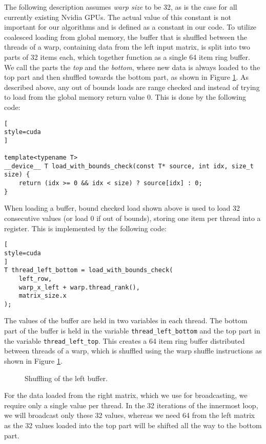 The following description assumes \textit{warp size} to be 32, as is the case for all currently existing Nvidia GPUs. The actual value of this constant is not important for our algorithms and is defined as a constant in our code. To utilize coalesced loading from global memory, the buffer that is shuffled between the threads of a warp, containing data from the left input matrix, is split into two parts of 32 items each, which together function as a single 64 item ring buffer. We call the parts the \textit{top} and the \textit{bottom}, where new data is always loaded to the top part and then shuffled towards the bottom part, as shown in Figure \ref{fig:shuffle_buffer}. As described above, any out of bounds loads are range checked and instead of trying to load from the global memory return value 0. This is done by the following code:
\begin{lstlisting}[
style=cuda
]

template<typename T>
__device__ T load_with_bounds_check(const T* source, int idx, size_t size) {
	return (idx >= 0 && idx < size) ? source[idx] : 0;
}
\end{lstlisting}


When loading a buffer, bound checked load shown above is used to load 32 consecutive values (or load 0 if out of bounds), storing one item per thread into a register. This is implemented by the following code:
\begin{lstlisting}[
style=cuda
]
T thread_left_bottom = load_with_bounds_check(
	left_row,
	warp_x_left + warp.thread_rank(),
	matrix_size.x
);

\end{lstlisting}

The values of the buffer are held in two variables in each thread. The bottom part of the buffer is held in the variable \texttt{thread\_left\_bottom} and the top part in the variable \texttt{thread\_left\_top}. This creates a 64 item ring buffer distributed between threads of a warp, which is shuffled using the warp shuffle instructions as shown in Figure \ref{fig:shuffle_buffer}.

\begin{figure}[ht]
	\centering
	\def\svgwidth{\textwidth}
	
	\caption{Shuffling of the left buffer.}
	\label{fig:shuffle_buffer}
\end{figure}

For the data loaded from the right matrix, which we use for broadcasting, we require only a single value per thread. In the 32 iterations of the innermost loop, we will broadcast only these 32 values, whereas we need 64 from the left matrix as the 32 values loaded into the top part will be shifted all the way to the bottom part.

